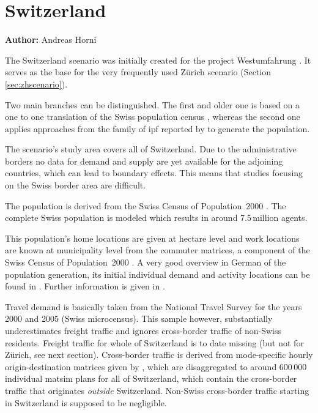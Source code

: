 \section{Switzerland}
\hfill \textbf{Author:} Andreas Horni

The Switzerland scenario was initially created for the project Westumfahrung \citep[][]{BalmerEtAl_ResRep_bdktzrh_2009}. It serves as the base for the very frequently used Zürich scenario (Section \ref{sec:zhscenario}). 

Two main branches can be distinguished. The first and older one is based on a one to one translation of the Swiss population census \citep[][]{BfS_VZ_2000}, whereas the second one applies approaches from the family of \gls{ipf} reported by \citet[][]{MuellerKAxhausen_TechRep_IVT_2013, Mueller_unpub_LATSIS_2012, Mueller_unpub_ETC_2011, Mueller_unpub_STRC_2011, Mueller_unpub_IATBR_2012} to generate the population.

The scenario's study area covers all of Switzerland. Due to the administrative borders no data for demand and supply are yet available for the adjoining countries, which can lead to boundary effects. This means that studies focusing on the Swiss border area are difficult.

The population is derived from the Swiss Census of Population~2000 \citep[][]{BfS_VZ_2000}. The complete Swiss population is modeled which results in around 7.5\,million agents. 

This population's home locations are given at hectare level and work locations are known at municipality level from the commuter matrices, a component of the Swiss Census of Population~2000 \citep[][p.35]{BalmerEtAl_ResRep_bdktzrh_2009}. A very good overview in German of the population generation, its initial individual demand and activity locations can be found in \citet{MeisterEtAl_SVT_2009}. Further information is given in \citet[][]{CiariEtAl_STRC_2008, MeisterEtAl_WCTRS_2010, BalmerEtAl_ResRep_bdktzrh_2009, BalmerEtAl_ResRep_datapuls_2010, BalmerEtAl_HEUREKA_2008}.

Travel demand is basically taken from the National Travel Survey for the years 2000 and 2005 \citep[][]{BfS-MZ2005_manual_2006} (Swiss microcensus). This sample however, substantially underestimates freight traffic and ignores cross-border traffic of non-Swiss residents. Freight traffic for whole of Switzerland is to date missing (but not for Zürich, see next section). Cross-border traffic is derived from mode-specific hourly origin-destination matrices given by \citet[][]{VrticEtAl_ResRep_UVEK_2007}, which are disaggregated to around 600\,000 individual \gls{matsim} plans for all of Switzerland, which contain the cross-border traffic that originates \emph{outside} Switzerland. Non-Swiss cross-border traffic starting in Switzerland is supposed to be negligible. 

